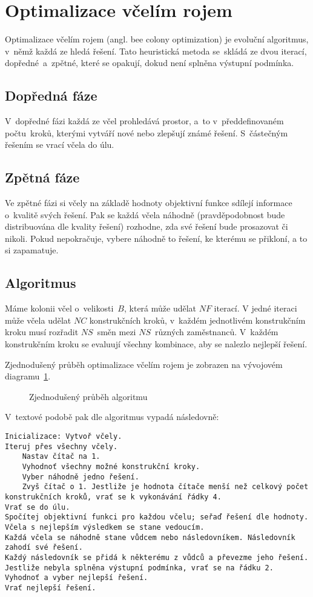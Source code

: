 \documentclass[twoside]{ctuthesis}
\begin{document}
\section{Optimalizace včelím rojem}
Optimalizace včelím rojem (angl. bee colony optimization) je evoluční algoritmus, v~němž každá ze  hledá řešení. Tato heuristická metoda se~skládá ze dvou iterací, dopředné~a~zpětné, které se opakují, dokud není splněna výstupní podmínka.

\subsection{Dopředná fáze}
V~dopředné fázi každá ze včel prohledává prostor, a~to v~předdefinovaném počtu~kroků, kterými vytváří nové nebo zlepšují známé řešení. S~částečným řešením se vrací včela do úlu. \cite{teodorovic2009bee}

\subsection{Zpětná fáze}
Ve zpětné fázi si včely na základě hodnoty objektivní funkce sdílejí informace o~kvalitě svých řešení. Pak se každá včela náhodně (pravděpodobnost bude distribuována dle kvality řešení) rozhodne, zda své řešení bude prosazovat či nikoli. Pokud nepokračuje, vybere náhodně to řešení, ke kterému se přikloní, a to si zapamatuje. \cite{teodorovic2009bee}

\subsection{Algoritmus}
Máme kolonii včel o~velikosti~$B$, která může udělat $NF$ iterací. V jedné iteraci může včela udělat $NC$ konstrukčních kroků, v~každém jednotlivém konstrukčním kroku musí rozřadit $NS$~směn mezi $NS$~různých zaměstnanců. V~každém konstrukčním kroku se evaluují všechny kombinace, aby se nalezlo nejlepší řešení. \cite{khader2013artificial}

Zjednodušený průběh optimalizace včelím rojem je zobrazen na vývojovém diagramu~\ref{fig:beeflow}.
\begin{figure}[h]
	
	\caption{Zjednodušený průběh algoritmu}
	\label{fig:beeflow}
\end{figure}

V~textové podobě pak dle \cite{rajeswari2017directed} algoritmus vypadá následovně:
\begin{lstlisting}
Inicializace: Vytvoř včely.
Iteruj přes všechny včely.
	Nastav čítač na 1.
	Vyhodnoť všechny možné konstrukční kroky.
	Vyber náhodně jedno řešení.
	Zvyš čítač o 1. Jestliže je hodnota čítače menší než celkový počet konstrukčních kroků, vrať se k vykonávání řádky 4.
Vrať se do úlu.
Spočítej objektivní funkci pro každou včelu; seřaď řešení dle hodnoty.
Včela s nejlepším výsledkem se stane vedoucím.
Každá včela se náhodně stane vůdcem nebo následovníkem. Následovník zahodí své řešení.
Každý následovník se přidá k některému z vůdců a převezme jeho řešení.
Jestliže nebyla splněna výstupní podmínka, vrať se na řádku 2.
Vyhodnoť a vyber nejlepší řešení.
Vrať nejlepší řešení.
\end{lstlisting}
\end{document}
